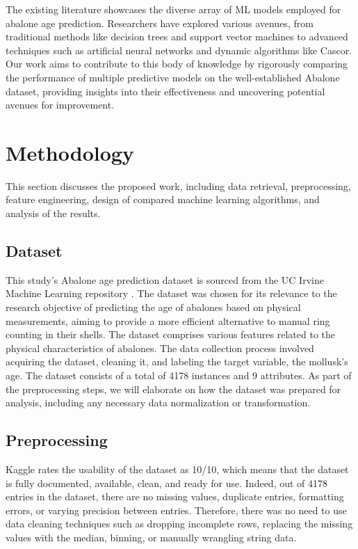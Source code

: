 \documentclass[12pt]{article}
\begin{document}
The existing literature showcases the diverse array of ML models employed for abalone age prediction. Researchers have explored various avenues, from traditional methods like decision trees and support vector machines to advanced techniques such as artificial neural networks and dynamic algorithms like Cascor. Our work aims to contribute to this body of knowledge by rigorously comparing the performance of multiple predictive models on the well-established Abalone dataset, providing insights into their effectiveness and uncovering potential avenues for improvement.

\section{Methodology}

This section discusses the proposed work, including data retrieval, preprocessing, feature engineering, design of compared machine learning algorithms, and analysis of the results.

\subsection{Dataset}


This study's Abalone age prediction dataset is sourced from the UC Irvine Machine Learning repository \cite{warwick_nash_abalone_1994}. The dataset was chosen for its relevance to the research objective of predicting the age of abalones based on physical measurements, aiming to provide a more efficient alternative to manual ring counting in their shells. The dataset comprises various features related to the physical characteristics of abalones. The data collection process involved acquiring the dataset, cleaning it, and labeling the target variable, the mollusk's age. The dataset consists of a total of 4178 instances and 9 attributes. As part of the preprocessing steps, we will elaborate on how the dataset was prepared for analysis, including any necessary data normalization or transformation.

\subsection{Preprocessing}

Kaggle rates the usability of the dataset as 10/10, which means that the dataset is fully documented, available, clean, and ready for use. Indeed, out of 4178 entries in the dataset, there are no missing values, duplicate entries, formatting errors, or varying precision between entries. Therefore, there was no need to use data cleaning techniques such as dropping incomplete rows, replacing the missing values with the median, binning, or manually wrangling string data.
\end{document}
